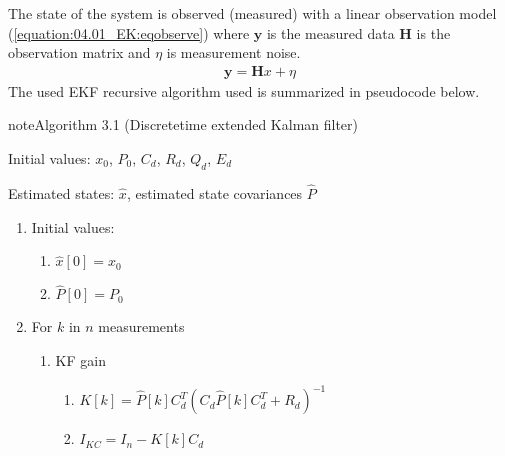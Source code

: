 \documentclass[review]{elsarticle}
\begin{document}
\sphinxAtStartPar
The state of the system is observed (measured) with a linear observation model (\autoref{equation:04.01_EK:eqobserve}) where \(\mathbf{y}\) is the measured data \(\mathbf{H}\) is the observation matrix and \(\eta\) is measurement noise.
\begin{equation}\label{equation:04.01_EK:eqobserve}
\begin{split}\mathbf{y} = \mathbf{H} x + \eta\end{split}
\end{equation}
\sphinxAtStartPar
The used EKF recursive algorithm used is summarized in pseudocode below.
\label{04.01_EK:ek-algorithm}
\begin{sphinxadmonition}{note}{Algorithm 3.1 (Discrete\sphinxhyphen{}time extended Kalman filter)}



\sphinxAtStartPar
{} Initial values: \(x_0\), \(P_0\), \(C_d\), \(R_d\), \(Q_d\), \(E_d\)

\sphinxAtStartPar
{} Estimated states: \(\hat{x}\), estimated state covariances \(\hat{P}\)
\begin{enumerate}
%
\item {} 
\sphinxAtStartPar
Initial values:
\begin{enumerate}
%
\item {} 
\sphinxAtStartPar
\(\hat{x}[0] = x_0\)

\item {} 
\sphinxAtStartPar
\(\hat{P}[0] = P_0\)

\end{enumerate}

\item {} 
\sphinxAtStartPar
For \(k\) in \(n\) measurements
\begin{enumerate}
%
\item {} 
\sphinxAtStartPar
KF gain
\begin{enumerate}
%
\item {} 
\sphinxAtStartPar
\(K[k]=\hat{P}[k] C_d^T \left(C_d \hat{P}[k] C_d^T + R_d\right)^{-1}\)

\item {} 
\sphinxAtStartPar
\(I_{KC} = I_n - K[k] C_d\)

\end{enumerate}


\end{enumerate}
\end{enumerate}
\end{sphinxadmonition}
\end{document}
